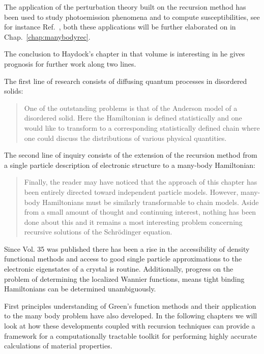 The application of the perturbation theory built on the recursion method 
has been used to study photoemission phenomena \cite{mclean77}
and to compute susceptibilities, see for instance Ref.~\cite{terakura78},
both these applications will be further elaborated on in Chap.~\ref{chap:manybodyrec}.

The conclusion to Haydock's chapter in that volume is interesting in he gives 
prognosis for further work along two lines. 

The first line of research consists of diffusing quantum processes in disordered
solids:
%
\begin{quote}
One of the outstanding problems is that of the Anderson model
of a disordered solid. Here the Hamiltonian is defined statistically and
one would like to transform to a corresponding statistically defined chain where
one could discuss the distributions of various physical quantities.
\end{quote}
%

The second line of inquiry consists of the extension of the recursion method
from a single particle description of electronic structure to a many-body Hamiltonian:
%
\begin{quote}
Finally, the reader may have noticed that the approach of this chapter has been entirely directed
toward independent particle models. However, many-body Hamiltonians must be similarly 
transformable to chain models. Aside from a small amount of thought and continuing interest, 
nothing has been done about this and it remains a most interesting problem concerning recursive 
solutions of the Schr\"odinger equation.
\end{quote}

Since Vol. 35 was published there has been a rise in the accessibility of density functional methods 
and access to good single particle approximations to the electronic eigenstates of a crystal
is routine. Additionally, progress on the problem of determining the localized Wannier functions, 
means tight binding Hamiltonians can be determined unambiguously.

First principles understanding of Green's function methods and their application to the many body
problem have also developed. In the following chapters we will look at how these developments
coupled with recursion techniques can provide a framework for a computationally tractable 
toolkit for performing highly accurate calculations of material properties.

